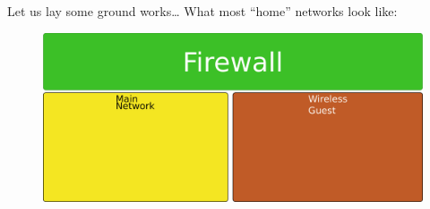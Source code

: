 \begin{frame}
	{
		{Let us lay some ground works…}\linebreak
		{What most “home” networks look like:}
	}
	\begin{figure}[H]
		\centering
        \includegraphics[width=\linewidth]{IMAGES/Network-Basic}
	\end{figure}

\end{frame}

\cprotect{}

